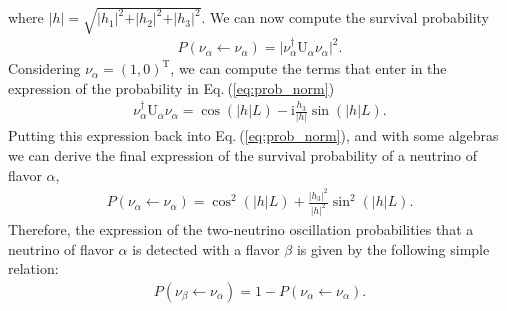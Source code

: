 \documentclass[twocolumn,secnumarabic,amssymb, nobibnotes, aps, prd,10pt]{revtex4-1}
\newcommand{\Eq}[1]{Eq.$\:$(\ref{#1})}
\begin{document}
where $\vert h \vert = \sqrt{ \vert h_1 \vert^2 + \vert h_2 \vert^2 +
\vert h_3 \vert^2}$. We can now compute the survival probability 
\begin{align}
P (\nu_\alpha \longleftarrow \nu_\alpha) = \vert \nu_\alpha^\dagger \mathrm{U}_\alpha
\nu_\alpha \vert^2 .
\label{eq:prob_norm}
\end{align} 
Considering $\nu_\alpha = (1,0)^\mathrm{T}$, we can compute the terms that enter in the
expression of the probability in \Eq{eq:prob_norm}
\begin{align}
\nu_\alpha^\dagger \mathrm{U}_\alpha \nu_\alpha = \cos (\vert h \vert L) - \mathrm{i}
\frac{h_3}{\vert h \vert} \sin (\vert h \vert L).
\end{align}
Putting this expression back into \Eq{eq:prob_norm}, and with some algebras we can
derive the final expression of the survival probability of a neutrino of flavor $\alpha$,
\begin{align}
P (\nu_\alpha \longleftarrow \nu_\alpha) =  \cos^2 (\vert h \vert L) +
\frac{\vert h_3 \vert^2 }{\vert h \vert^2} \sin^2 (\vert h \vert L).
\end{align}
Therefore, the expression of the two-neutrino oscillation probabilities that a neutrino
of flavor $\alpha$ is detected with a flavor $\beta$ is given by the following simple
relation:
\begin{align}
P (\nu_\beta \longleftarrow \nu_\alpha) = 1 - P (\nu_\alpha \longleftarrow \nu_\alpha).
\end{align}
\end{document}

